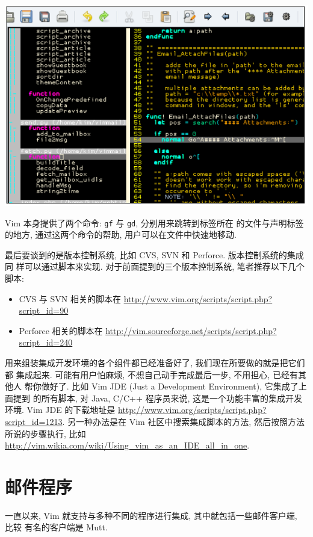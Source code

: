 \begin{center}
    \includegraphics[scale=0.6]{./images/page209.png}
\end{center}
Vim 本身提供了两个命令: \texttt{gf} 与 \texttt{gd}, 分别用来跳转到标签所在
的文件与声明标签的地方, 通过这两个命令的帮助, 用户可以在文件中快速地移动.

最后要谈到的是版本控制系统, 比如 CVS, SVN 和 Perforce. 版本控制系统的集成同
样可以通过脚本来实现. 对于前面提到的三个版本控制系统, 笔者推荐以下几个脚本:
\begin{itemize}
    \item CVS 与 SVN 相关的脚本在
        \url{http://www.vim.org/scripts/script.php?script_id=90}
    \item Perforce 相关的脚本在
        \url{http://vim.sourceforge.net/scripts/script.php?script_id=240}
\end{itemize}

用来组装集成开发环境的各个组件都已经准备好了, 我们现在所要做的就是把它们都
集成起来. 可能有用户怕麻烦, 不想自己动手完成最后一步, 不用担心, 已经有其他人
帮你做好了. 比如 Vim JDE (Just a Development Environment), 它集成了上面提到
的所有脚本, 对 Java, C/C++ 程序员来说, 这是一个功能丰富的集成开发环境. Vim JDE
的下载地址是 \url{http://www.vim.org/scripts/script.php?script_id=1213}.
另一种办法是在 Vim 社区中搜索集成脚本的方法, 然后按照方法所说的步骤执行,
比如 \url{http://vim.wikia.com/wiki/Using_vim_as_an_IDE_all_in_one}.

\section{邮件程序}
\label{sec:mail_program}

一直以来, Vim 就支持与多种不同的程序进行集成, 其中就包括一些邮件客户端, 比较
有名的客户端是 Mutt.


